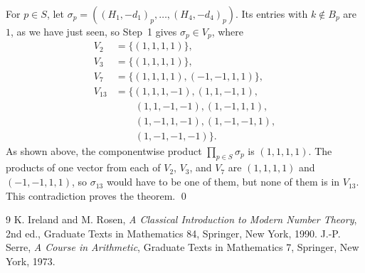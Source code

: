 \documentclass[11pt]{article}
\begin{document}
For $p\in S$, let $\sigma_p=((H_1,-d_1)_p,\dots,(H_{4},-d_{4})_p)$. Its entries with $k\notin B_p$ are $1$, as we have just seen, so Step~1 gives $\sigma_p\in V_p$, where
\begin{align*}
V_{2}&=\{(1,1,1,1)\},\\
V_{3}&=\{(1,1,1,1)\},\\
V_{7}&=\{(1,1,1,1),(-1,-1,1,1)\},\\
V_{13}&=\{(1,1,1,-1),(1,1,-1,1),\\
&\qquad(1,1,-1,-1),(1,-1,1,1),\\
&\qquad(1,-1,1,-1),(1,-1,-1,1),\\
&\qquad(1,-1,-1,-1)\}.
\end{align*}
As shown above, the componentwise product $\prod_{p\in S}\sigma_p$ is $(1,1,1,1)$. The products of one vector from each of $V_{2}$, $V_{3}$, and $V_{7}$ are $(1,1,1,1)$ and $(-1,-1,1,1)$, so $\sigma_{13}$ would have to be one of them, but none of them is in $V_{13}$. This contradiction proves the theorem.
\qed

\begin{thebibliography}{9}
 K. Ireland and M. Rosen, \emph{A Classical Introduction to Modern Number Theory}, 2nd ed., Graduate Texts in Mathematics 84, Springer, New York, 1990.
 J.-P. Serre, \emph{A Course in Arithmetic}, Graduate Texts in Mathematics 7, Springer, New York, 1973.
\end{thebibliography}
\end{document}
